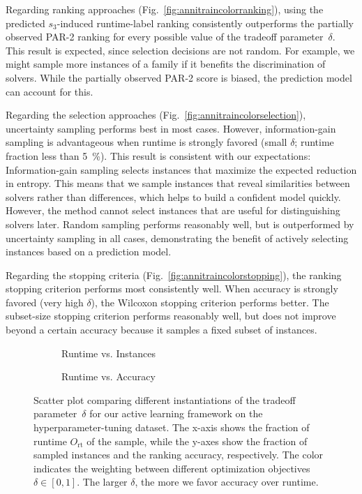 \documentclass[sn-basic, Numbered]{sn-jnl} %
\begin{document}
Regarding ranking approaches (Fig.~\ref{fig:annitraincolorranking}), using the predicted $s_3$-induced run\-time-label ranking consistently outperforms the partially observed PAR-2 ranking for every possible value of the tradeoff parameter~$\delta$.
This result is expected, since selection decisions are not random.
For example, we might sample more instances of a family if it benefits the discrimination of solvers.
While the partially observed PAR-2 score is biased, the prediction model can account for this.

Regarding the selection approaches (Fig.~\ref{fig:annitraincolorselection}), uncertainty sampling performs best in most cases.
However, information-gain sampling is advantageous when runtime is strongly favored (small $\delta$; runtime fraction less than \SI{5}{\%}).
This result is consistent with our expectations:
Information-gain sampling selects instances that maximize the expected reduction in entropy.
This means that we sample instances that reveal similarities between solvers rather than differences, which helps to build a confident model quickly.
However, the method cannot select instances that are useful for distinguishing solvers later.
Random sampling performs reasonably well, but is outperformed by uncertainty sampling in all cases, demonstrating the benefit of actively selecting instances based on a prediction model.

Regarding the stopping criteria (Fig.~\ref{fig:annitraincolorstopping}), the ranking stopping criterion performs most consistently well.
When accuracy is strongly favored (very high $\delta$), the Wilcoxon stopping criterion performs better.
The subset-size stopping criterion performs reasonably well, but does not improve beyond a certain accuracy because it samples a fixed subset of instances.

\begin{figure}[tb!]
  \centering
  \begin{subfigure}{0.4775\textwidth}
    \caption{Runtime vs. Instances}
    \label{fig:annitrainoptgoalruntime}
  \end{subfigure}
  \begin{subfigure}{0.5125\textwidth}
    \caption{Runtime vs. Accuracy}
    \label{fig:annitrainoptgoalacc}
  \end{subfigure}

  \caption{
    Scatter plot comparing different instantiations of the tradeoff parameter~$\delta$ for our active learning framework on the hyperparameter-tuning dataset.
    The x-axis shows the fraction of runtime $O_{\operatorname{rt}}$ of the sample, while the y-axes show the fraction of sampled instances and the ranking accuracy, respectively.
    The color indicates the weighting between different optimization objectives $\delta \in \left[0, 1\right]$.
    The larger $\delta$, the more we favor accuracy over runtime.
  }
  \label{fig:annitrainoptgoal}
\end{figure}
\end{document}
